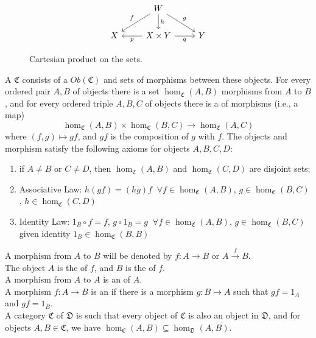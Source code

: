 \begin{figure}[H]
\centering
\[\begin{tikzcd}
& W \arrow[swap]{ld}{f} \arrow{d}{h} \arrow{dr}{g} \\
X &  X \times Y \arrow{l}{p} \arrow[swap]{r}{q} & Y
\end{tikzcd}
\]
\caption{Cartesian product on the sets.}
\end{figure}


\begin{definition}
A  $\mathfrak{C}$ consists of a  $Ob(\mathfrak{C})$ and sets of morphisms between these objects. For every ordered pair $A,B$ of objects there is a set $\hom_{\mathfrak{C}}(A,B)$ morphisms from $A$ to $B$, and for every ordered triple $A,B,C$ of objects there is a  of morphisms (i.e., a map)
\begin{equation}
\hom_{\mathfrak{C}}(A,B) \times \hom_{\mathfrak{C}}(B,C) \rightarrow \hom_{\mathfrak{C}}(A,C) \nonumber
\end{equation}
where $(f,g) \mapsto gf$, and $gf$ is the composition of $g$ with $f$. The objects and morphism satisfy the following axioms for objects $A,B,C,D$:
\begin{enumerate}[label=(\roman*)]
\setlength{\itemsep}{0pt}
\item if $A \neq B$ or $C \neq D$, then $\hom_{\mathfrak{C}}(A,B)$ and $\hom_{\mathfrak{C}}(C,D)$ are disjoint sets;
\item Associative Law: $h(gf) = (hg)f$ $\ \forall f \in \hom_{\mathfrak{C}}(A,B)$, $g \in \hom_{\mathfrak{C}}(B,C)$, $h \in \hom_{\mathfrak{C}}(C,D)$
\item Identity Law: $1_B \circ f = f$, $g \circ 1_B = g$ $\ \forall f \in \hom_{\mathfrak{C}}(A,B)$, $g \in \hom_{\mathfrak{C}}(B,C)$ given identity $1_B \in \hom_{\mathfrak{C}}(B,B)$
\end{enumerate}
\end{definition}

\begin{definition}
A morphism from $A$ to $B$ will be denoted by $f: A \rightarrow B$ or $A \xrightarrow{f} B$.\\
The object $A$ is the  of $f$, and $B$ is the  of $f$.\\
A morphism from $A$ to $A$ is an  of $A$.\\
A morphism $f: A \rightarrow B$ is an  if there is a morphism $g: B \rightarrow A$ such that $gf = 1_A$ and $gf = 1_B$.\\
A  category $\mathfrak{C}$ of $\mathfrak{D}$ is such that every object of $\mathfrak{C}$ is also an object in $\mathfrak{D}$, and for objects $A,B \in \mathfrak{C}$, we have $\hom_{\mathfrak{C}}(A,B) \subseteq \hom_{\mathfrak{D}}(A,B)$.
\end{definition}

